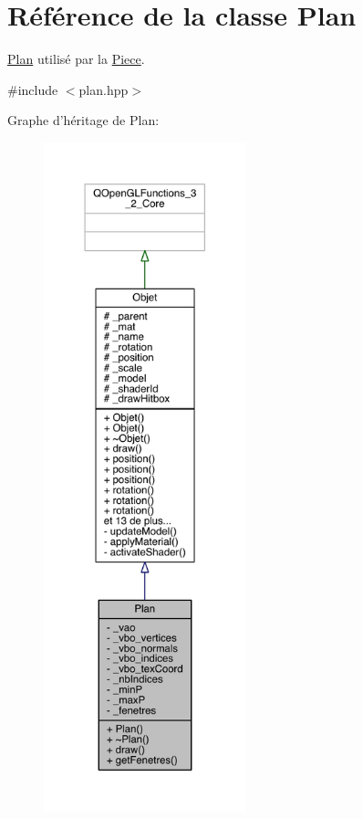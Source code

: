 \hypertarget{class_plan}{\section{Référence de la classe Plan}
\label{class_plan}
}


\hyperlink{class_plan}{Plan} utilisé par la \hyperlink{class_piece}{Piece}.  




{\ttfamily \#include $<$plan.\+hpp$>$}



Graphe d'héritage de Plan\+:
\nopagebreak
\begin{figure}[H]
\begin{center}
\leavevmode
\includegraphics[height=550pt]{class_plan__inherit__graph}
\end{center}
\end{figure}


